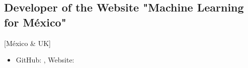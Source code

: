 \documentclass{mycv}
\begin{document}
\subsection{Developer of the Website "Machine Learning for M\'exico"}[M\'exico \& UK]
\begin{itemize}
\item GitHub: \href{https://github.com/ML4MX}{\faGithubAlt}, Website: \href{https://ml4mx.github.io/website/}{\faExternalLink} 
\end{itemize}
\end{document}
